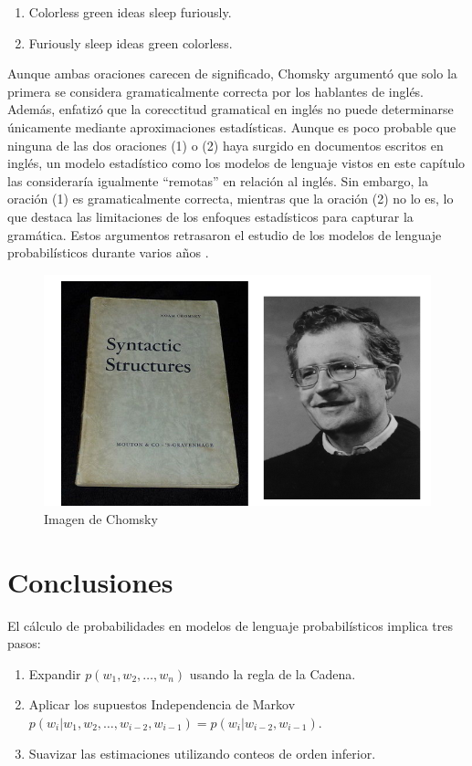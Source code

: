 \begin{enumerate}
    \item Colorless green ideas sleep furiously.
    \item Furiously sleep ideas green colorless.
\end{enumerate}

Aunque ambas oraciones carecen de significado, Chomsky argumentó que solo la primera se considera gramaticalmente correcta por los hablantes de inglés. Además, enfatizó que la corecctitud gramatical en inglés no puede determinarse únicamente mediante aproximaciones estadísticas. Aunque es poco probable que ninguna de las dos oraciones (1) o (2) haya surgido en documentos escritos en inglés, un modelo estadístico como los modelos de lenguaje vistos en este capítulo las consideraría igualmente ``remotas'' en relación al inglés. Sin embargo, la oración (1) es gramaticalmente correcta, mientras que la oración (2) no lo es, lo que destaca las limitaciones de los enfoques estadísticos para capturar la gramática. Estos argumentos retrasaron el estudio de los modelos de lenguaje probabilísticos durante varios años \cite{JurafskyBook}.

\begin{figure}[h]
    \centering
    \includegraphics[scale = 0.4]{pics/chomsky.png}
    \caption{Imagen de Chomsky}
    \label{fig:chomsky}
\end{figure}


\section{Conclusiones}
El cálculo de probabilidades en modelos de lenguaje probabilísticos implica tres pasos:
    \begin{enumerate}
        \item Expandir $p(w_1, w_2, \ldots, w_n)$ usando la regla de la Cadena.
        \item Aplicar los supuestos Independencia de Markov \\
        $p(w_i | w_1, w_2, \ldots, w_{i-2}, w_{i-1}) = p(w_i | w_{i-2}, w_{i-1})$.
        \item Suavizar las estimaciones utilizando conteos de orden inferior.
    \end{enumerate}

